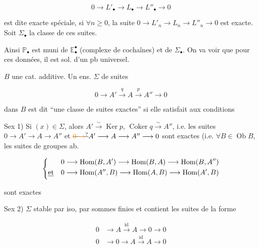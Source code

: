 
\[
 0\longrightarrow L'_{\bullet}\longrightarrow L_{\bullet}\longrightarrow L''_{\bullet}\longrightarrow 0
\]

 est dite exacte spéciale, si $\forall n\geq0$, la suite $0\to L'_n\longrightarrow L_n\longrightarrow L''_n\longrightarrow0$ est exacte. Soit $\Sigma_{\bullet}$ la classe de ces suites.

Ainsi $\mathbb P_{\bullet}$ est muni de $\mathbb E_{\bullet}^{\bullet}$ (complexe de cochaînes) et de $\Sigma_{\bullet}$. On va voir que pour ces données, il est sol. d'un pb universel.

\margin{!}

 $B$ une cat. additive. Un ens. $\Sigma$ de suites

\[
 0\longrightarrow A'\xrightarrow{q} A\xrightarrow{p}A''\longrightarrow0 \tag*{(x)}
\]

dans $B$ est dit ``une classe de suites exactes'' si elle satisfait aux conditions

Sex 1) Si $(x)\in\Sigma$, alors $A'\overset{\sim}{\longrightarrow}\operatorname{Ker}p$, $\operatorname{Coker}q\overset{\sim}{\longrightarrow}A''$, i.e. les suites $0\longrightarrow A'\longrightarrow A\longrightarrow A''$ et $\deleted{\unsure{0\to}}A'\longrightarrow A\longrightarrow A''\longrightarrow0$ sont exactes (i.e. $\forall B\in\operatorname{Ob}B$, les suites de groupes ab.

\[
 \left\{\begin{aligned}
 0&\longrightarrow\operatorname{Hom}(B,A')\longrightarrow\operatorname{Hom}(B,A)\longrightarrow\operatorname{Hom}(B,A'')\\
 \deleted{\text{et}}\quad0&\longrightarrow\operatorname{Hom}(A'',B)\longrightarrow\operatorname{Hom}(A,B)\longrightarrow\operatorname{Hom}(A',B)
 \end{aligned}\right.
\]

sont exactes

Sex 2) $\Sigma$ stable par iso, par sommes finies et contient les suites de la forme

\[
 \begin{aligned}0&\longrightarrow A\xrightarrow{\mathrm{id}} A\longrightarrow0\longrightarrow0\\
 0&\longrightarrow0\longrightarrow A\xrightarrow{\mathrm{id}} A\longrightarrow0\end{aligned}
\]

